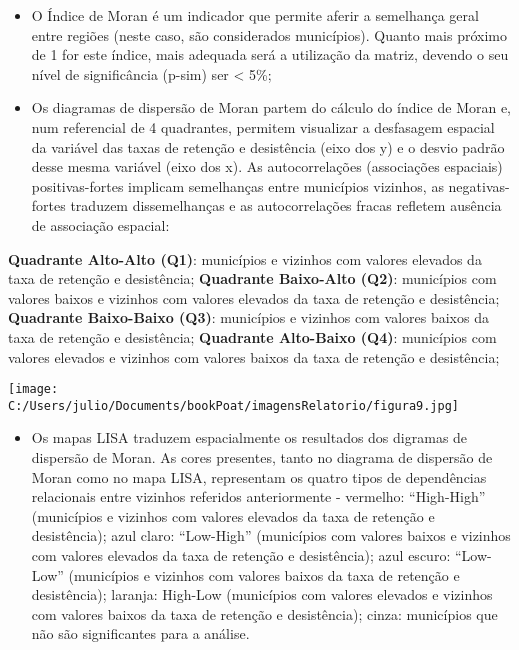 \documentclass[
]{book}
\providecommand{\tightlist}{%
  \setlength{\itemsep}{0pt}\setlength{\parskip}{0pt}}
\begin{document}
\begin{itemize}
\tightlist
\item
  O Índice de Moran é um indicador que permite aferir a semelhança geral entre regiões (neste caso, são considerados municípios). Quanto mais próximo de 1 for este índice, mais adequada será a utilização da matriz, devendo o seu nível de significância (p-sim) ser \textless{} 5\%;
\item
  Os diagramas de dispersão de Moran partem do cálculo do índice de Moran e, num referencial de 4 quadrantes, permitem visualizar a desfasagem espacial da variável das taxas de retenção e desistência (eixo dos y) e o desvio padrão desse mesma variável (eixo dos x). As autocorrelações (associações espaciais) positivas-fortes implicam semelhanças entre municípios vizinhos, as negativas-fortes traduzem dissemelhanças e as autocorrelações fracas refletem ausência de associação espacial:
\end{itemize}

\textbf{Quadrante Alto-Alto (Q1)}: municípios e vizinhos com valores elevados da taxa de retenção e desistência;
\textbf{Quadrante Baixo-Alto (Q2)}: municípios com valores baixos e vizinhos com valores elevados da taxa de retenção e desistência;
\textbf{Quadrante Baixo-Baixo (Q3)}: municípios e vizinhos com valores baixos da taxa de retenção e desistência;
\textbf{Quadrante Alto-Baixo (Q4)}: municípios com valores elevados e vizinhos com valores baixos da taxa de retenção e desistência;

\texttt{[image: C:/Users/julio/Documents/bookPoat/imagensRelatorio/figura9.jpg]}

\begin{itemize}
\tightlist
\item
  Os mapas LISA traduzem espacialmente os resultados dos digramas de dispersão de Moran. As cores presentes, tanto no diagrama de dispersão de Moran como no mapa LISA, representam os quatro tipos de dependências relacionais entre vizinhos referidos anteriormente - vermelho: ``High-High'' (municípios e vizinhos com valores elevados da taxa de retenção e desistência); azul claro: ``Low-High'' (municípios com valores baixos e vizinhos com valores elevados da taxa de retenção e desistência); azul escuro: ``Low-Low'' (municípios e vizinhos com valores baixos da taxa de retenção e desistência); laranja: High-Low (municípios com valores elevados e vizinhos com valores baixos da taxa de retenção e desistência); cinza: municípios que não são significantes para a análise.
\end{itemize}
\end{document}
